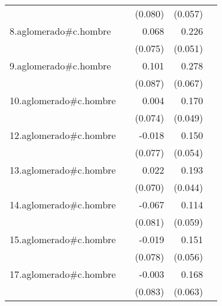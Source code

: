{\begin{longtable}{l*{4}{D{.}{.}{-1}}}
            &                     &     (0.080)         &     (0.057)         &                     \\
\addlinespace
8.aglomerado#c.hombre&                     &       0.068         &       0.226\sym{***}&                     \\
            &                     &     (0.075)         &     (0.051)         &                     \\
\addlinespace
9.aglomerado#c.hombre&                     &       0.101         &       0.278\sym{***}&                     \\
            &                     &     (0.087)         &     (0.067)         &                     \\
\addlinespace
10.aglomerado#c.hombre&                     &       0.004         &       0.170\sym{***}&                     \\
            &                     &     (0.074)         &     (0.049)         &                     \\
\addlinespace
12.aglomerado#c.hombre&                     &      -0.018         &       0.150\sym{**} &                     \\
            &                     &     (0.077)         &     (0.054)         &                     \\
\addlinespace
13.aglomerado#c.hombre&                     &       0.022         &       0.193\sym{***}&                     \\
            &                     &     (0.070)         &     (0.044)         &                     \\
\addlinespace
14.aglomerado#c.hombre&                     &      -0.067         &       0.114         &                     \\
            &                     &     (0.081)         &     (0.059)         &                     \\
\addlinespace
15.aglomerado#c.hombre&                     &      -0.019         &       0.151\sym{**} &                     \\
            &                     &     (0.078)         &     (0.056)         &                     \\
\addlinespace
17.aglomerado#c.hombre&                     &      -0.003         &       0.168\sym{**} &                     \\
            &                     &     (0.083)         &     (0.063)         &                     \\

\end{longtable}}
